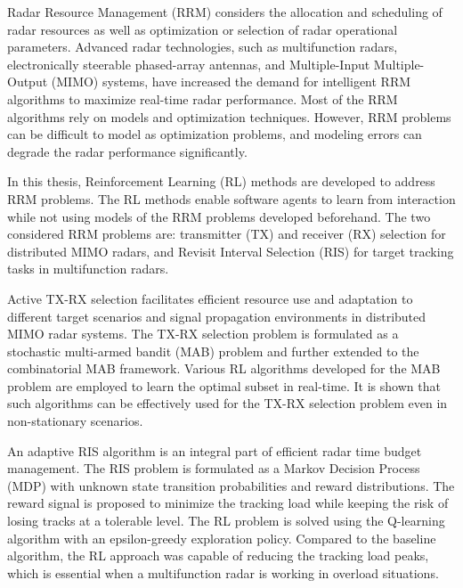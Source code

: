 \documentclass[english, 12pt, a4paper, elec, utf8, a-1b, online]{aaltothesis}
\date{31.7.2020}
\numberwithin{equation}{section}
\begin{document}
\makecoverpage

\makecopyrightpage


\begin{abstractpage}[english]
Radar Resource Management (RRM) considers the allocation and scheduling of radar resources as well as optimization or selection of radar operational parameters.
Advanced radar technologies, such as multifunction radars, electronically steerable phased-array antennas, and Multiple-Input Multiple-Output (MIMO) systems, have increased the demand for intelligent RRM algorithms to maximize real-time radar performance. 
Most of the RRM algorithms rely on models and optimization techniques. 
However, RRM problems can be difficult to model as optimization problems, and modeling errors can degrade the radar performance significantly.

In this thesis, Reinforcement Learning (RL) methods are developed to address RRM problems.
The RL methods enable software agents to learn from interaction while not using models of the RRM problems developed beforehand. 
The two considered RRM problems are: transmitter (TX) and receiver (RX) selection for distributed MIMO radars, and Revisit Interval Selection (RIS) for target tracking tasks in multifunction radars.

Active TX-RX selection facilitates efficient resource use and adaptation to different target scenarios and signal propagation environments in distributed MIMO radar systems. 
The TX-RX selection problem is formulated as a stochastic multi-armed bandit (MAB) problem and further extended to the combinatorial MAB framework.
Various RL algorithms developed for the MAB problem are employed to learn the optimal subset in real-time. 
It is shown that such algorithms can be effectively used for the TX-RX selection problem even in non-stationary scenarios.

An adaptive RIS algorithm is an integral part of efficient radar time budget management.
The RIS problem is formulated as a Markov Decision Process (MDP) with unknown state transition probabilities and reward distributions. 
The reward signal is proposed to minimize the tracking load while keeping the risk of losing tracks at a tolerable level. 
The RL problem is solved using the Q-learning algorithm with an epsilon-greedy exploration policy.
Compared to the baseline algorithm, the RL approach was capable of reducing the tracking load peaks, which is essential when a multifunction radar is working in overload situations.
\end{abstractpage}
\end{document}
